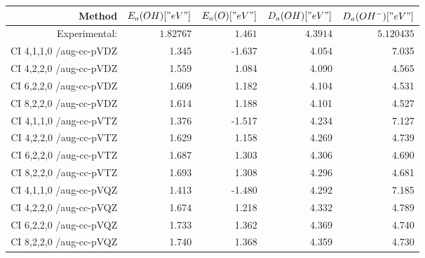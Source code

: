 \label{TODO}
\begin{tabular}{rrrrr}
\toprule
Method & $E_a(OH)[" eV"]$ & $E_a(O)[" eV"]$ & $D_a(OH)[" eV"]$ & $D_a(OH^-)[" eV"]$ \\ \midrule
Experimental:  & $1.82767$ & $1.461$ &        $4.3914$ & $5.120435$ \\ \midrule
CI 4,1,1,0 /aug-cc-pVDZ & 1.345 & -1.637 & 4.054 & 7.035\\
CI 4,2,2,0 /aug-cc-pVDZ & 1.559 & 1.084 & 4.090 & 4.565\\
CI 6,2,2,0 /aug-cc-pVDZ & 1.609 & 1.182 & 4.104 & 4.531\\
CI 8,2,2,0 /aug-cc-pVDZ & 1.614 & 1.188 & 4.101 & 4.527\\
CI 4,1,1,0 /aug-cc-pVTZ & 1.376 & -1.517 & 4.234 & 7.127\\
CI 4,2,2,0 /aug-cc-pVTZ & 1.629 & 1.158 & 4.269 & 4.739\\
CI 6,2,2,0 /aug-cc-pVTZ & 1.687 & 1.303 & 4.306 & 4.690\\
CI 8,2,2,0 /aug-cc-pVTZ & 1.693 & 1.308 & 4.296 & 4.681\\
CI 4,1,1,0 /aug-cc-pVQZ & 1.413 & -1.480 & 4.292 & 7.185\\
CI 4,2,2,0 /aug-cc-pVQZ & 1.674 & 1.218 & 4.332 & 4.789\\
CI 6,2,2,0 /aug-cc-pVQZ & 1.733 & 1.362 & 4.369 & 4.740\\
CI 8,2,2,0 /aug-cc-pVQZ & 1.740 & 1.368 & 4.359 & 4.730\\
\bottomrule
\end{tabular}
    